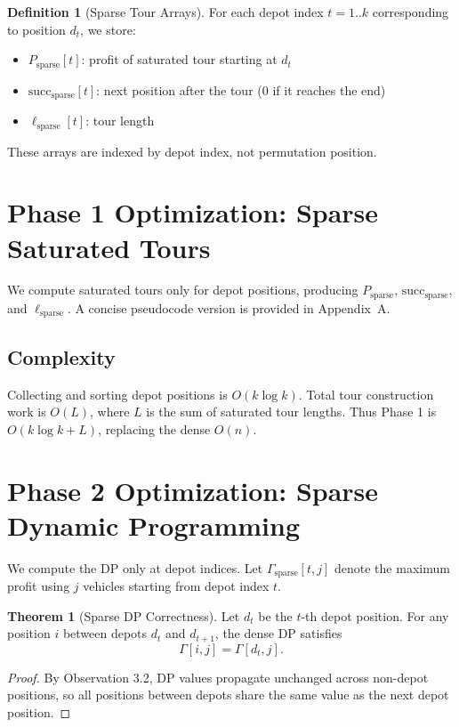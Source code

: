 \documentclass[11pt]{article}
\theoremstyle{definition}
\newtheorem{definition}{Definition}[section]
\newtheorem{theorem}{Theorem}[section]
\begin{document}
\begin{definition}[Sparse Tour Arrays]
For each depot index $t = 1..k$ corresponding to position $d_t$, we store:
\begin{itemize}[nosep]
  \item $P_{\text{sparse}}[t]$: profit of saturated tour starting at $d_t$
  \item $\text{succ}_{\text{sparse}}[t]$: next position after the tour (0 if it reaches the end)
  \item $\ell_{\text{sparse}}[t]$: tour length
\end{itemize}
These arrays are indexed by depot index, not permutation position.
\end{definition}

\section{Phase 1 Optimization: Sparse Saturated Tours}

We compute saturated tours only for depot positions, producing $P_{\text{sparse}}$, $\text{succ}_{\text{sparse}}$, and $\ell_{\text{sparse}}$. A concise pseudocode version is provided in Appendix~A.

\subsection*{Complexity}
Collecting and sorting depot positions is $O(k \log k)$. Total tour construction work is $O(L)$, where $L$ is the sum of saturated tour lengths. Thus Phase 1 is $O(k \log k + L)$, replacing the dense $O(n)$.

\section{Phase 2 Optimization: Sparse Dynamic Programming}

We compute the DP only at depot indices. Let $\Gamma_{\text{sparse}}[t, j]$ denote the maximum profit using $j$ vehicles starting from depot index $t$.

\begin{theorem}[Sparse DP Correctness]
Let $d_t$ be the $t$-th depot position. For any position $i$ between depots $d_t$ and $d_{t+1}$, the dense DP satisfies
\[
\Gamma[i, j] = \Gamma[d_t, j].
\]
\end{theorem}

\begin{proof}
By Observation 3.2, DP values propagate unchanged across non-depot positions, so all positions between depots share the same value as the next depot position.
\end{proof}
\end{document}
